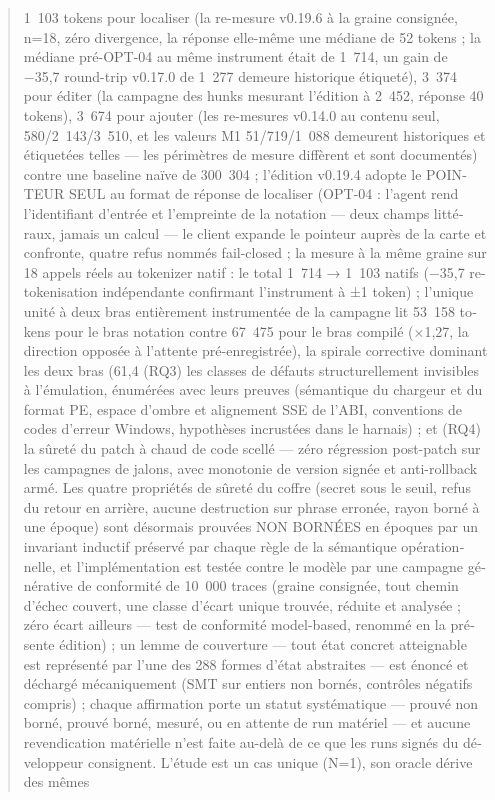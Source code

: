 \documentclass[11pt,a4paper]{article}
\begin{document}
\begin{otherlanguage}{french}
\begin{abstract}
1~103 tokens pour localiser (la re-mesure v0.19.6 à la graine consignée,
n=18, zéro divergence, la réponse elle-même une médiane de 52 tokens ;
la médiane pré-OPT-04 au même instrument était de 1~714, un gain de
−35,7 %
round-trip v0.17.0 de 1~277 demeure historique étiqueté), 3~374 pour
éditer (la campagne des hunks mesurant l'édition à 2~452, réponse 40
tokens), 3~674 pour ajouter (les re-mesures v0.14.0 au contenu seul,
580/2~143/3~510, et les valeurs M1 51/719/1~088 demeurent historiques et
étiquetées telles — les
périmètres de mesure diffèrent et sont documentés) contre une baseline
naïve de 300~304 ; l'édition v0.19.4 adopte le POINTEUR SEUL au
format de réponse de localiser (OPT-04 : l'agent rend l'identifiant
d'entrée et l'empreinte de la notation — deux champs littéraux, jamais un
calcul — le client expande le pointeur auprès de la carte et confronte,
quatre refus nommés fail-closed ; la mesure à la même graine sur 18
appels réels au tokenizer natif : le total 1~714 → 1~103 natifs
(−35,7 %
re-tokenisation indépendante confirmant l'instrument à ±1 token) ;
l'unique unité à deux
bras entièrement instrumentée de la campagne lit 53~158 tokens pour le
bras notation contre 67~475 pour le bras compilé (×1,27, la direction
opposée à l'attente pré-enregistrée), la spirale corrective dominant les
deux bras (61,4 %
(RQ3) les classes de défauts structurellement invisibles à l'émulation,
énumérées avec leurs preuves (sémantique du chargeur et du format PE,
espace d'ombre et alignement SSE de l'ABI, conventions de codes d'erreur
Windows, hypothèses incrustées dans le harnais) ; et (RQ4) la sûreté du
patch à chaud de code scellé — zéro régression post-patch sur les
campagnes de jalons, avec monotonie de version signée et anti-rollback
armé. Les quatre propriétés de sûreté du coffre (secret sous le seuil, refus du retour en arrière, aucune destruction sur phrase erronée, rayon borné à une époque) sont désormais prouvées NON BORNÉES en époques par un invariant inductif préservé par chaque règle de la sémantique opérationnelle, et l'implémentation est testée contre le modèle par une campagne générative de conformité de 10~000 traces (graine consignée, tout chemin d'échec couvert, une classe d'écart unique trouvée, réduite et analysée ; zéro écart ailleurs — test de conformité model-based, renommé en la présente édition) ; un lemme de couverture — tout état concret atteignable est représenté par l'une des 288 formes d'état abstraites — est énoncé et déchargé mécaniquement (SMT sur entiers non bornés, contrôles négatifs compris) ; chaque affirmation porte un statut systématique — prouvé non borné, prouvé borné, mesuré, ou en attente de run matériel — et aucune revendication matérielle n'est faite au-delà de ce que les runs signés du développeur consignent. L'étude est un cas unique (N=1), son oracle dérive des mêmes

\end{abstract}
\end{otherlanguage}
\end{document}
